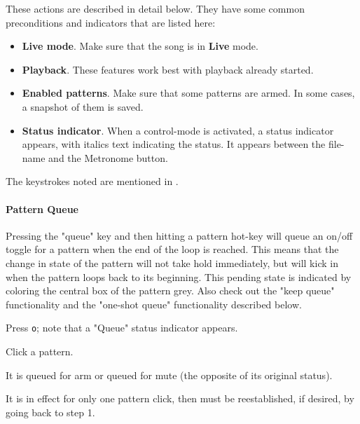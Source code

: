    These actions are described in detail below.
   They have some common preconditions and indicators that are listed here:

   \begin{itemize}
      \item \textbf{Live mode}.
         Make sure that the song is in \textbf{Live} mode.
      \item \textbf{Playback}.
         These features work best with playback already started.
      \item \textbf{Enabled patterns}.
         Make sure that some patterns are armed.
         In some cases, a snapshot of them is saved.
      \item \textbf{Status indicator}.
         When a control-mode is activated, a status indicator appears, with
         italics text indicating the status. It appears between the
         file-name and the Metronome button.
   \end{itemize}

   The keystrokes noted are mentioned in
   .

\paragraph{Pattern Queue}
\label{paragraph:patterns_pattern_queue}

   Pressing the "queue" key and then hitting a pattern hot-key
   will queue an on/off toggle for a pattern when the end of the loop is
   reached.
   This means that the change in state of the pattern will not take hold
   immediately, but will kick in when the pattern loops back to its beginning.
   This pending state is indicated by coloring the central box of the
   pattern grey.
   Also check out the "keep queue" functionality and
   the "one-shot queue" functionality described below.

   \begin{enumber}
      \item Press \texttt{o}; note that a "Queue" status indicator appears.
      \item Click a pattern.
      \item It is queued for arm or queued for mute (the opposite of its
         original status).
      \item It is in effect for only one pattern click, then must be
         reestablished, if desired, by going back to step 1.
   \end{enumber}

